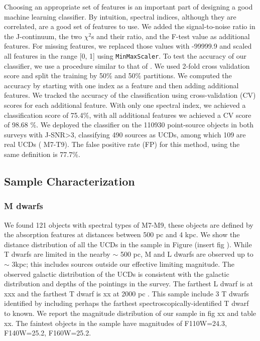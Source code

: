 \documentclass[manuscript]{aastex63}
\begin{document}
Choosing an appropriate set of features is an important part of designing a good machine learning classifier. By intuition, spectral indices, although they are correlated, are a good set of features to use. We added the signal-to-noise ratio in the J-continuum, the two $\chi^2$s and their ratio, and the F-test value as additional features. For missing features, we replaced those values with -99999.9 and scaled all features in the range [0, 1] using \texttt{MinMaxScaler}. To test the accuracy of our classifier, we use a procedure similar to that of \citep{2017AJ....153...73M}. We used 2-fold cross validation score and split the training by 50\% and 50\% partitions. We computed the accuracy by starting with one index as a feature and then adding additional features. We tracked the accuracy of the classification using cross-validation (CV) scores for each additional feature. With only one spectral index, we achieved a classification score of 75.4\%, with all additional features we achieved a CV score of 98.68 \%. We deployed the classifier on the 110930 point-source objects in both surveys with J-SNR\textgreater 3, classifying 490 sources as UCDs, among which 109 are real UCDs ( M7-T9). The false positive rate (FP) for this method, using the same definition is 77.7\%.

\subsection{Sample Characterization}\label{sec:results}

\subsubsection{M dwarfs}
We found 121 objects with spectral types of M7-M9, these objects are defined by the \wat absorption features at distances between 500 pc and 4 kpc. We show the distance distribution of all the UCDs in the sample in Figure (insert fig ). While T dwarfs are limited in the nearby $\sim$ 500 pc, M and L dwarfs are observed up to $\sim$ 3kpc; this includes sources outside our effective limiting magnitude. The observed galactic distribution of the UCDs is consistent with the galactic distribution and depths of the pointings in the survey. The farthest L dwarf is at xxx and the farthest T dwarf is xx at 2000 pc . This sample include 3 T dwarfs identified by \cite{2012ApJ...752L..14M} including perhaps the farthest spectroscopically-identified T dwarf to known. We report the magnitude distribution of our sample in fig xx and table xx. The faintest objects in the sample have magnitudes of F110W=24.3, F140W=25.2, F160W=25.2. 
\end{document}
